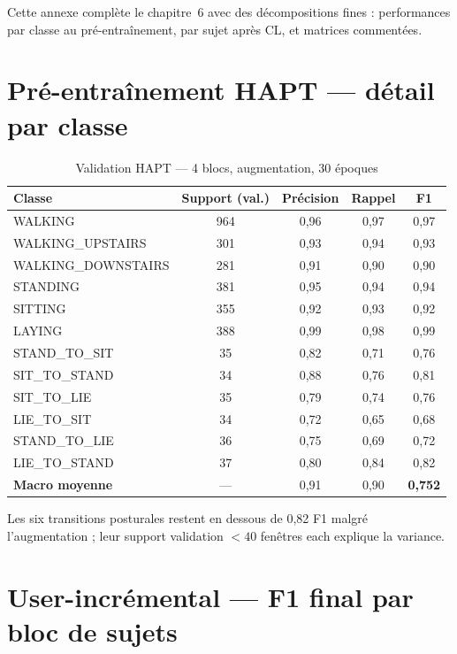 \documentclass[a4paper,12pt]{report}
\begin{document}
Cette annexe complète le chapitre~6 avec des décompositions fines : performances
par classe au pré-entraînement, par sujet après CL, et matrices commentées.

\section{Pré-entraînement HAPT — détail par classe}

\begin{table}[H]
\centering
\small
\begin{tabularx}{\textwidth}{|>{\raggedright\arraybackslash}Y|c|c|c|c|}
\hline
\textbf{Classe} & \textbf{Support (val.)} & \textbf{Précision} & \textbf{Rappel} & \textbf{F1} \\
\hline
WALKING & 964 & 0,96 & 0,97 & 0,97 \\
WALKING\_UPSTAIRS & 301 & 0,93 & 0,94 & 0,93 \\
WALKING\_DOWNSTAIRS & 281 & 0,91 & 0,90 & 0,90 \\
STANDING & 381 & 0,95 & 0,94 & 0,94 \\
SITTING & 355 & 0,92 & 0,93 & 0,92 \\
LAYING & 388 & 0,99 & 0,98 & 0,99 \\
STAND\_TO\_SIT & 35 & 0,82 & 0,71 & 0,76 \\
SIT\_TO\_STAND & 34 & 0,88 & 0,76 & 0,81 \\
SIT\_TO\_LIE & 35 & 0,79 & 0,74 & 0,76 \\
LIE\_TO\_SIT & 34 & 0,72 & 0,65 & 0,68 \\
STAND\_TO\_LIE & 36 & 0,75 & 0,69 & 0,72 \\
LIE\_TO\_STAND & 37 & 0,80 & 0,84 & 0,82 \\
\hline
\textbf{Macro moyenne} & — & 0,91 & 0,90 & \textbf{0,752} \\
\hline
\end{tabularx}
\caption{Validation HAPT — 4 blocs, augmentation, 30 époques}
\label{tab:app_perclass_hapt}
\end{table}

Les six transitions posturales restent en dessous de 0,82 F1 malgré l'augmentation ;
leur support validation $< 40$ fenêtres each explique la variance.

\section{User-incrémental — F1 final par bloc de sujets}
\end{document}
